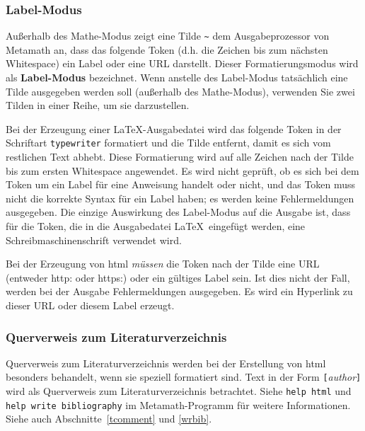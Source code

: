 \subsubsection{Label-Modus}

Außerhalb des Mathe-Modus zeigt eine Tilde \verb/~/ dem Ausgabeprozessor von Metamath an, dass das folgende Token (d.h. die Zeichen bis zum nächsten Whitespace) ein Label oder eine URL darstellt. Dieser Formatierungsmodus wird als {\bf Label-Modus} bezeichnet. Wenn anstelle des Label-Modus tatsächlich eine Tilde ausgegeben werden soll (außerhalb des Mathe-Modus), verwenden Sie zwei Tilden in einer Reihe, um sie darzustellen.

Bei der Erzeugung einer \LaTeX-Ausgabedatei wird das folgende Token in der Schriftart \texttt{typewriter} formatiert und die Tilde entfernt, damit es sich vom restlichen Text abhebt. Diese Formatierung wird auf alle Zeichen nach der Tilde bis zum ersten Whitespace angewendet. Es wird nicht geprüft, ob es sich bei dem Token um ein Label für eine Anweisung handelt oder nicht, und das Token muss nicht die korrekte Syntax für ein Label haben; es werden keine Fehlermeldungen ausgegeben.  Die einzige Auswirkung des Label-Modus auf die Ausgabe ist, dass für die Token, die in die Ausgabedatei \LaTeX\ eingefügt werden, eine Schreibmaschinenschrift verwendet wird.

Bei der Erzeugung von {\sc html} {\em müssen} die Token nach der Tilde eine URL (entweder http: oder https:) oder ein gültiges Label sein. Ist dies nicht der Fall, werden bei der Ausgabe Fehlermeldungen ausgegeben. Es wird ein Hyperlink zu dieser URL oder diesem Label erzeugt.

\subsubsection{Querverweis zum Literaturverzeichnis}%

Querverweis zum Literaturverzeichnis werden bei der Erstellung von {\sc html} besonders behandelt, wenn sie speziell formatiert sind. Text in der Form \texttt{[}{\em author}\texttt{]} wird als Querverweis zum Literaturverzeichnis betrachtet. Siehe \texttt{help html} und \texttt{help write bibliography} im Metamath-Programm für weitere Informationen.
Siehe auch Abschnitte~\ref{tcomment} und \ref{wrbib}.

